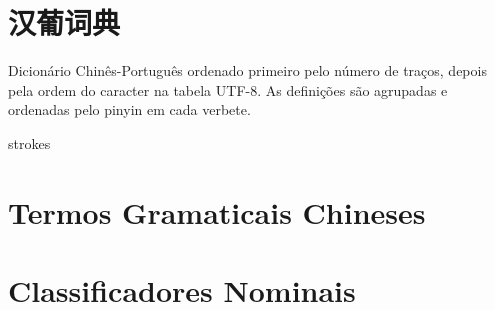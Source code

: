 \documentclass[a4paper,9pt,twoside,openright,book]{memoir}
\begin{document}



\clearpage
\pagestyle{empty}
\tableofcontents

\clearpage
\pagestyle{empty}
\chapter{汉葡词典}

%
%

Dicionário Chinês-Português ordenado primeiro pelo número de traços,
depois pela ordem do caracter na tabela UTF-8.  As definições são
agrupadas e ordenadas pelo pinyin em cada verbete.

\clearpage
\begin{DictionaryEntries}{strokes}
 
 
 
 
 
 
 
 
 
 
 
 
 
 
 
 
 
 
 
 
 
 
% 
% 
% 
% 
% 
% 
% 
% 
% 
\end{DictionaryEntries}

\ifdraftdoc 
\else

\pagestyle{plain}

\clearpage
\chapter{Termos Gramaticais Chineses}


\clearpage
\chapter{Classificadores Nominais}

\end{document}
